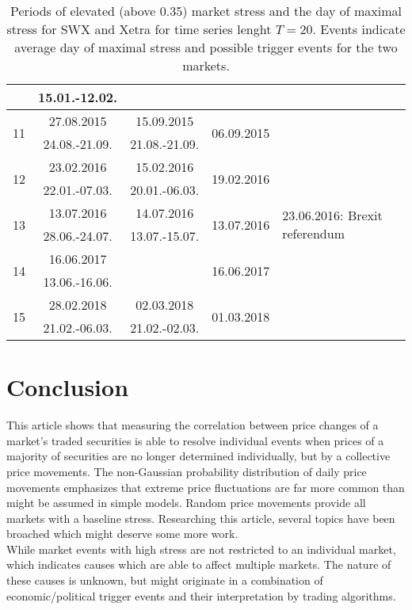 \documentclass[11pt,twoside,a4paper]{article}
\numberwithin{equation}{section}
\numberwithin{figure}{section}
\numberwithin{table}{section}
\begin{document}
\begin{table}[!ht]
\begin{tabular}{c|c|c|c|l}
							 & 15.01.-12.02.	& & &\\
\hline
\multirow{2}{*}{11} & 27.08.2015 		& 15.09.2015     & \multirow{2}{*}{06.09.2015} & \multirow{2}{0.33\linewidth}{}\\
							 & 24.08.-21.09.	& 21.08.-21.09. & &\\
\hline
\multirow{2}{*}{12} & 23.02.2016 		& 15.02.2016     & \multirow{2}{*}{19.02.2016} & \multirow{2}{0.33\linewidth}{}\\
							 & 22.01.-07.03.	& 20.01.-06.03. & &\\
\hline
\multirow{2}{*}{13} & 13.07.2016 		& 14.07.2016     & \multirow{2}{*}{13.07.2016} & \multirow{2}{0.33\linewidth}{23.06.2016: Brexit referendum}\\
							 & 28.06.-24.07.	& 13.07.-15.07. & &\\
\hline
\multirow{2}{*}{14} & 16.06.2017 		& & \multirow{2}{*}{16.06.2017} & \multirow{2}{0.33\linewidth}{}\\
							 & 13.06.-16.06.	& & &\\
\hline
\multirow{2}{*}{15} & 28.02.2018 		& 02.03.2018     & \multirow{2}{*}{01.03.2018} & \multirow{2}{0.33\linewidth}{}\\
							 & 21.02.-06.03.	& 21.02.-02.03. & &\\
\hline
\end{tabular}
\caption{Periods of elevated (above 0.35) market stress and the day of maximal stress for SWX and Xetra for time series lenght $T=20$. Events indicate average day of maximal stress and possible trigger events for the two markets.}
\label{tab_marketevents}
\end{table}
\clearpage
\section{Conclusion}
This article shows that measuring the correlation between price changes of a market's traded securities is able to resolve individual events when prices of a majority of securities are no longer determined individually, but by a collective price movements. The non-Gaussian probability distribution of daily price movements emphasizes that extreme price fluctuations are far more common than might be assumed in simple models. Random price movements provide all markets with a baseline stress. Researching this article, several topics have been broached which might deserve some more work.\\

While market events with high stress are not restricted to an individual market, which indicates causes which are able to affect multiple markets. The nature of these causes is unknown, but might originate in a combination of economic/political trigger events and their interpretation by trading algorithms.\\
\end{document}
